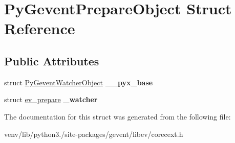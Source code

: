 \hypertarget{struct_py_gevent_prepare_object}{}\section{Py\+Gevent\+Prepare\+Object Struct Reference}
\label{struct_py_gevent_prepare_object}
\subsection*{Public Attributes}
\begin{DoxyCompactItemize}
\item 
\mbox{\label{struct_py_gevent_prepare_object_adaa2de79d191e336c0743efae2a9bc6e}} 
struct \hyperlink{struct_py_gevent_watcher_object}{Py\+Gevent\+Watcher\+Object} {\bfseries \+\_\+\+\_\+pyx\+\_\+base}
\item 
\mbox{\label{struct_py_gevent_prepare_object_a9f63a1677377530b2dd16c0c52bed3db}} 
struct \hyperlink{structev__prepare}{ev\+\_\+prepare} {\bfseries \+\_\+watcher}
\end{DoxyCompactItemize}


The documentation for this struct was generated from the following file\+:\begin{DoxyCompactItemize}
\item 
venv/lib/python3./site-\/packages/gevent/libev/corecext.\+h\end{DoxyCompactItemize}

